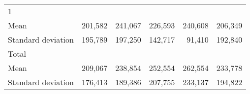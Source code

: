 \begin{tabular}{llllll}
\multicolumn{1}{l}{\hspace{3em}1} &
  \multicolumn{1}{|r}{} &
  \multicolumn{1}{r}{} &
  \multicolumn{1}{r}{} &
  \multicolumn{1}{r}{} &
  \multicolumn{1}{r}{} \\
\multicolumn{1}{l}{\hspace{4em}Mean} &
  \multicolumn{1}{|r}{201,582} &
  \multicolumn{1}{r}{241,067} &
  \multicolumn{1}{r}{226,593} &
  \multicolumn{1}{r}{240,608} &
  \multicolumn{1}{r}{206,349} \\
\multicolumn{1}{l}{\hspace{4em}Standard deviation} &
  \multicolumn{1}{|r}{195,789} &
  \multicolumn{1}{r}{197,250} &
  \multicolumn{1}{r}{142,717} &
  \multicolumn{1}{r}{91,410} &
  \multicolumn{1}{r}{192,840} \\
\multicolumn{1}{l}{\hspace{3em}Total} &
  \multicolumn{1}{|r}{} &
  \multicolumn{1}{r}{} &
  \multicolumn{1}{r}{} &
  \multicolumn{1}{r}{} &
  \multicolumn{1}{r}{} \\
\multicolumn{1}{l}{\hspace{4em}Mean} &
  \multicolumn{1}{|r}{209,067} &
  \multicolumn{1}{r}{238,854} &
  \multicolumn{1}{r}{252,554} &
  \multicolumn{1}{r}{262,554} &
  \multicolumn{1}{r}{233,778} \\
\multicolumn{1}{l}{\hspace{4em}Standard deviation} &
  \multicolumn{1}{|r}{176,413} &
  \multicolumn{1}{r}{189,386} &
  \multicolumn{1}{r}{207,755} &
  \multicolumn{1}{r}{233,137} &
  \multicolumn{1}{r}{194,822} \\
\cline{1-6}
\end{tabular}

